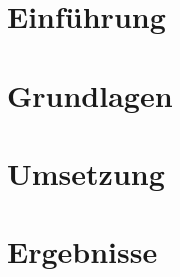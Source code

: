 \documentclass{scrreprt}
\begin{document}
\tableofcontents		%
\newpage
{}	%

\chapter{Einführung}




\chapter{Grundlagen}




\chapter{Umsetzung}









\chapter{Ergebnisse}







\end{document}
